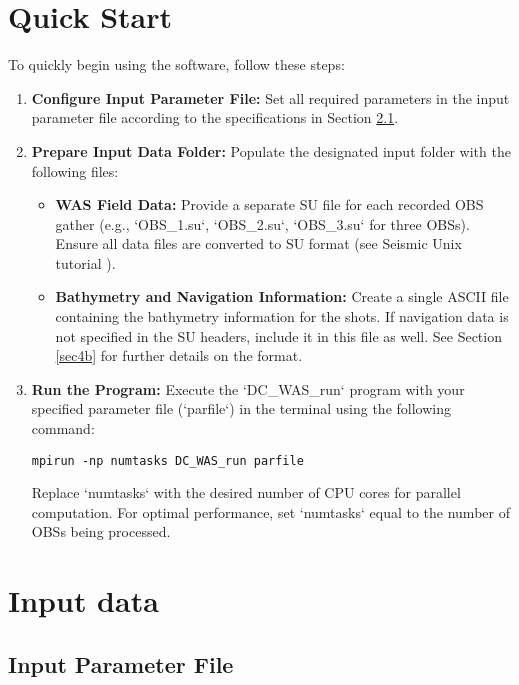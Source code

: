 \documentclass[11pt, oneside]{article}   	%
\begin{document}
\section{Quick Start}\label{sec3}

To quickly begin using the software, follow these steps:

\begin{enumerate}
    \item \textbf{Configure Input Parameter File:}
    Set all required parameters in the input parameter file according to the specifications in Section \ref{sec4a}.

    \item \textbf{Prepare Input Data Folder:}
    Populate the designated input folder with the following files:
    \begin{itemize}
        \item \textbf{WAS Field Data:} Provide a separate SU file for each recorded OBS gather (e.g., `OBS\_1.su`, `OBS\_2.su`, `OBS\_3.su` for three OBSs). Ensure all data files are converted to SU format (see Seismic Unix tutorial \cite{SU}).
        \item \textbf{Bathymetry and Navigation Information:} Create a single ASCII file containing the bathymetry information for the shots. If navigation data is not specified in the SU headers, include it in this file as well. See Section \ref{sec4b} for further details on the format.
    \end{itemize}

    \item \textbf{Run the Program:}
    Execute the `DC\_WAS\_run` program with your specified parameter file (`parfile`) in the terminal using the following command:
    \begin{verbatim}
mpirun -np numtasks DC_WAS_run parfile
    \end{verbatim}
    Replace `numtasks` with the desired number of CPU cores for parallel computation. For optimal performance, set `numtasks` equal to the number of OBSs being processed.
\end{enumerate}

\section{Input data}\label{sec4}

\subsection{Input Parameter File}\label{sec4a}
\end{document}
